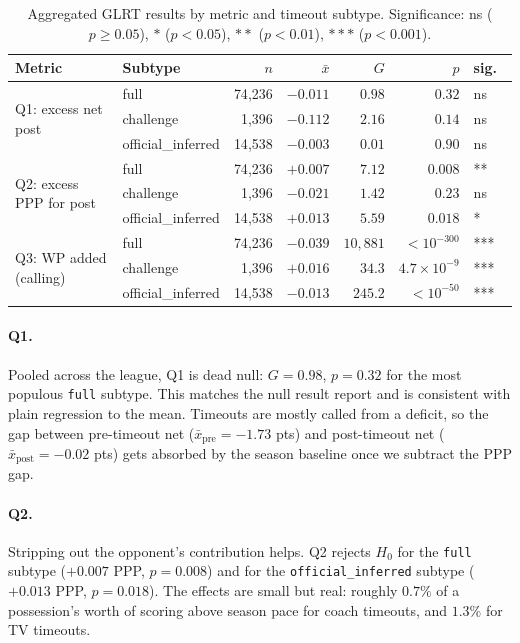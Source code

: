 \documentclass[twoside,11pt]{article}
\begin{document}
\begin{table}[t]
		\centering
		\small
		\begin{tabular}{llrrrrl}
				\toprule
				Metric & Subtype & $n$ & $\bar x$ & $G$ & $p$ & sig.\ \\
				\midrule
				\multirow{3}{*}{Q1: excess net post}
				& full              & 74{,}236 & $-0.011$ & $0.98$    & $0.32$  & ns  \\
				& challenge         & 1{,}396  & $-0.112$ & $2.16$    & $0.14$  & ns  \\
				& official\_inferred& 14{,}538 & $-0.003$ & $0.01$    & $0.90$  & ns  \\
				\midrule
				\multirow{3}{*}{Q2: excess PPP for post}
				& full              & 74{,}236 & $+0.007$ & $7.12$    & $0.008$ & **  \\
				& challenge         & 1{,}396  & $-0.021$ & $1.42$    & $0.23$  & ns  \\
				& official\_inferred& 14{,}538 & $+0.013$ & $5.59$    & $0.018$ & *   \\
				\midrule
				\multirow{3}{*}{Q3: WP added (calling)}
				& full              & 74{,}236 & $-0.039$ & $10{,}881$ & $<10^{-300}$ & *** \\
				& challenge         & 1{,}396  & $+0.016$ & $34.3$    & $4.7\!\times\!10^{-9}$  & *** \\
				& official\_inferred& 14{,}538 & $-0.013$ & $245.2$   & $<10^{-50}$  & *** \\
				\bottomrule
		\end{tabular}
		\caption{Aggregated GLRT results by metric and timeout subtype.
				Significance: ns ($p \geq 0.05$), $*$ ($p < 0.05$), $**$ ($p < 0.01$),
		$***$ ($p < 0.001$).}
		\label{tab:overall}
\end{table}

\paragraph{Q1.} Pooled across the league, Q1 is dead null: $G = 0.98$,
$p = 0.32$ for the most populous \texttt{full} subtype. This matches
the null result \citet{assis2020stop} report and is consistent with
plain regression to the mean. Timeouts are mostly called from a
deficit, so the gap between pre-timeout net
($\bar x_{\text{pre}} = -1.73$ pts) and post-timeout net
($\bar x_{\text{post}} = -0.02$ pts) gets absorbed by the season
baseline once we subtract the PPP gap.

\paragraph{Q2.} Stripping out the opponent's contribution helps. Q2
rejects $H_0$ for the \texttt{full} subtype ($+0.007$ PPP, $p = 0.008$)
and for the \texttt{official\_inferred} subtype ($+0.013$ PPP,
$p = 0.018$). The effects are small but real: roughly $0.7\%$ of a
possession's worth of scoring above season pace for coach timeouts, and
$1.3\%$ for TV timeouts.
\end{document}
